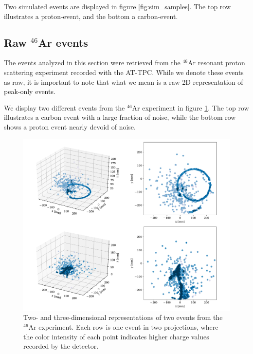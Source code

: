 \documentclass[review,number,sort&compress]{elsarticle}
\begin{document}
Two simulated events are displayed in figure \ref{fig:sim_samples}. The top row illustrates a proton-event, and the bottom a carbon-event. 



\subsection{Raw \texorpdfstring{${}^{46}$Ar}{46Ar}  events}\label{sec:data_real}

The events analyzed in this section were retrieved from the ${}^{46}$Ar resonant proton scattering experiment recorded with the AT-TPC. 
While we denote these events as raw, it is important to note that what we mean is a raw 2D representation of peak-only events.


We display two different events from the ${}^{46}$Ar experiment in figure \ref{fig:samples}. The top row illustrates a carbon event with a large fraction of noise, while the bottom row shows a proton event nearly devoid of noise.

\begin{figure}[ht]
\centering
\includegraphics[width=\textwidth]{custom_work/examples_raw.pdf}
\caption[Displaying unfiltered events in 2D and 3D]{Two- and three-dimensional representations of two events from the ${}^{46}$Ar experiment. Each row is one event in two projections, where the color intensity of each point indicates higher charge values recorded by the detector.}\label{fig:samples}
\end{figure}
\end{document}

